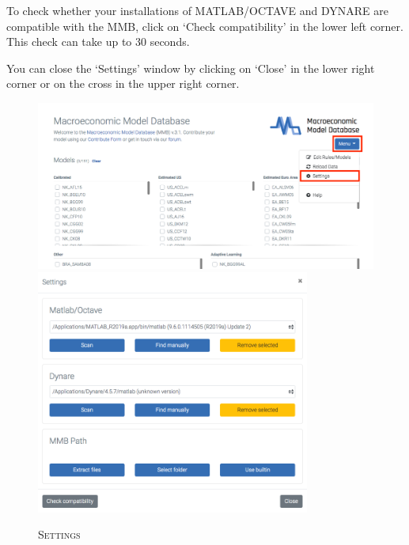 To check whether your installations of MATLAB/OCTAVE and DYNARE are compatible with the MMB, click on `Check compatibility' in the lower left corner. This check can take up to 30 seconds. 

You can close the `Settings' window by clicking on `Close' in the lower right corner or on the cross in the upper right corner.

\begin{figure}[H]%
\centering
\caption{\textsc{Settings}}
\vspace{0.2cm}
\includegraphics[width=12cm,keepaspectratio]{settings31}\\[1cm]
\includegraphics[width=9cm,keepaspectratio]{settings2_31.png}
\label{img:Settings}
\end{figure}






